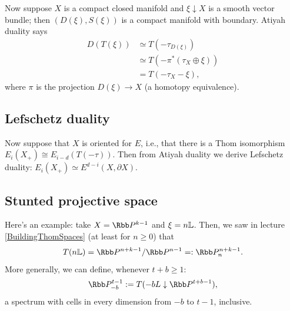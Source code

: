 Now suppose $X$ is a compact closed manifold and $\xi \downarrow X$ is a smooth vector bundle; then $(D(\xi), S(\xi))$ is a compact manifold with boundary.  Atiyah duality says
\begin{align*}
D(T(\xi))
& \simeq T(-\tau_{D(\xi)}) \\
& \simeq T(-\pi^*(\tau_X \oplus \xi)) \\
& = T(-\tau_X - \xi),
\end{align*}
where $\pi$ is the projection $D(\xi) \to X$ (a homotopy equivalence).
\subsection*{Lefschetz duality}
Now suppose that $X$ is oriented for $E$, i.e., that there is a Thom isomorphism $E_i(X_+)\cong E_{i-d}(T(-\tau))$. Then from Atiyah duality we derive Lefschetz duality: $E_i (X_+) \simeq E^{d-i}(X, \partial X)$.
\subsection*{Stunted projective space}
Here's an example: take $X = \RP^{k-1}$ and $\xi = n \mathbb{L}$. %
Then, we saw in lecture \ref{BuildingThomSpaces} (at least for $n\geq0$) that \[T(n \bundle{L}) = \RP^{n+k-1} / \RP^{n-1} =: \RP^{n+k-1}_n.\]
More generally, we can define, whenever $t+b\geq1$:
\[\RP^{t-1}_{-b}:= T(-bL\downarrow\RP^{t+b-1}),\]
a spectrum with cells in every dimension from $-b$ to $t-1$, inclusive.


